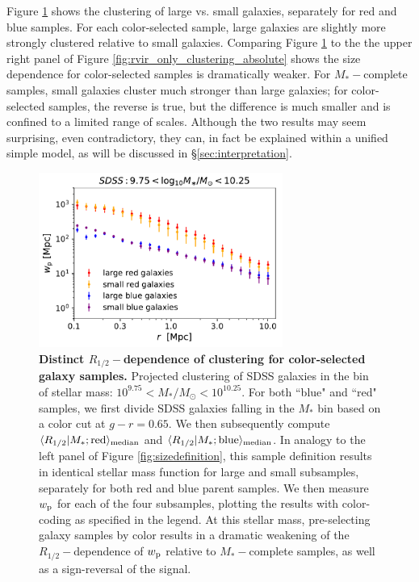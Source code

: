 \documentclass[usenatbib,usegraphicx,letterpaper]{mn2e}
\newcommand{\rhalf}{R_{1/2}}
\newcommand{\mstar}{M_{\ast}}
\newcommand{\wproj}{w_{\rm p}}
\newcommand{\median}[2]{\langle{#1}\vert{#2}\rangle_{\rm median}}
\newcommand{\msun}{M_\odot}
\begin{document}
Figure \ref{fig:colorclustering} shows the clustering of large vs. small galaxies, separately for red and blue samples. For each color-selected sample, large galaxies are slightly more strongly clustered relative to small galaxies. Comparing Figure \ref{fig:colorclustering} to the the upper right panel of Figure \ref{fig:rvir_only_clustering_absolute} shows the size dependence for color-selected samples is dramatically weaker.   For $\mstar-$complete samples, small galaxies cluster much stronger than large galaxies; for color-selected samples, the reverse is true, but the difference is much smaller and is confined to a limited range of scales.  Although the two results may seem surprising, even contradictory, they can, in fact be
explained within a unified simple model, as will be discussed in \S\ref{sec:interpretation}.

\begin{figure}
\centering
\includegraphics[width=8cm]{FIGS/color_selected_size_dependent_clustering.pdf}
\caption{
{\bf Distinct $\rhalf-$dependence of clustering for color-selected galaxy samples.}
Projected clustering of SDSS galaxies in the bin of stellar mass: $10^{9.75}<\mstar/\msun<10^{10.25}.$ For both ``blue" and ``red" samples, we first divide SDSS galaxies falling in the $\mstar$ bin based on a color cut at $g-r=0.65.$ We then subsequently compute $\median{\rhalf}{\mstar; {\rm red}}$ and $\median{\rhalf}{\mstar; {\rm blue}}$. In analogy to the left panel of Figure \ref{fig:sizedefinition}, this sample definition results in identical stellar mass function for large and small subsamples, separately for both red and blue parent samples. We then measure $\wproj$ for each of the four subsamples, plotting the results with color-coding as specified in the legend. At this stellar mass, pre-selecting galaxy samples by color results in a dramatic weakening of the $\rhalf-$dependence of $\wproj$ relative to $\mstar-$complete samples, as well as a sign-reversal of the signal.
}
\label{fig:colorclustering}
\end{figure}
\end{document}

